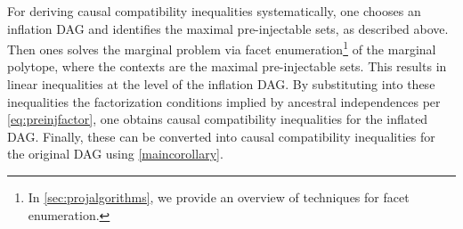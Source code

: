 {For deriving causal compatibility inequalities systematically, one chooses an inflation DAG and identifies the maximal pre-injectable sets, as described above. Then ones solves the marginal problem via facet enumeration\footnote{In \cref{sec:projalgorithms}, we provide an overview of techniques for facet enumeration.} of the marginal polytope, where the contexts are the maximal pre-injectable sets. This results in linear inequalities at the level of the inflation DAG.
By substituting into these inequalities the factorization conditions implied by ancestral independences per \cref{eq:preinjfactor}, one obtains causal compatibility inequalities for the inflated DAG.  Finally, these can be converted into causal compatibility inequalities for the original DAG using \cref{maincorollary}.




}
